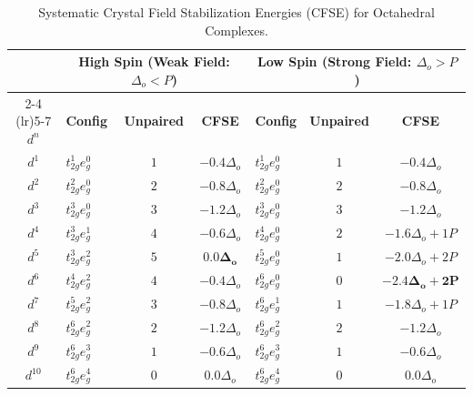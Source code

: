 \documentclass[10pt,a4paper]{article}
\begin{document}
\begin{table}[htbp]
\centering
\small
\renewcommand{\arraystretch}{1.25}
\begin{tabularx}{\textwidth}{c p{3.2cm} c c p{3.2cm} c c}
\toprule
& \multicolumn{3}{c}{\textbf{High Spin (Weak Field: $\Delta_o < P$)}} & \multicolumn{3}{c}{\textbf{Low Spin (Strong Field: $\Delta_o > P$)}} \\
\cmidrule(lr){2-4} \cmidrule(lr){5-7}
$d^n$ & \textbf{Config} & \textbf{Unpaired} & \textbf{CFSE} & \textbf{Config} & \textbf{Unpaired} & \textbf{CFSE} \\
\midrule
$d^1$ & $t_{2g}^1 e_g^0$ & $1$ & $-0.4\Delta_o$ & $t_{2g}^1 e_g^0$ & $1$ & $-0.4\Delta_o$ \\
$d^2$ & $t_{2g}^2 e_g^0$ & $2$ & $-0.8\Delta_o$ & $t_{2g}^2 e_g^0$ & $2$ & $-0.8\Delta_o$ \\
$d^3$ & $t_{2g}^3 e_g^0$ & $3$ & $-1.2\Delta_o$ & $t_{2g}^3 e_g^0$ & $3$ & $-1.2\Delta_o$ \\
$d^4$ & $t_{2g}^3 e_g^1$ & $4$ & $-0.6\Delta_o$ & $t_{2g}^4 e_g^0$ & $2$ & $-1.6\Delta_o + 1P$ \\
$d^5$ & $t_{2g}^3 e_g^2$ & $5$ & $\mathbf{0.0\Delta_o}$ & $t_{2g}^5 e_g^0$ & $1$ & $-2.0\Delta_o + 2P$ \\
$d^6$ & $t_{2g}^4 e_g^2$ & $4$ & $-0.4\Delta_o$ & $t_{2g}^6 e_g^0$ & $0$ & $\mathbf{-2.4\Delta_o + 2P}$ \\
$d^7$ & $t_{2g}^5 e_g^2$ & $3$ & $-0.8\Delta_o$ & $t_{2g}^6 e_g^1$ & $1$ & $-1.8\Delta_o + 1P$ \\
$d^8$ & $t_{2g}^6 e_g^2$ & $2$ & $-1.2\Delta_o$ & $t_{2g}^6 e_g^2$ & $2$ & $-1.2\Delta_o$ \\
$d^9$ & $t_{2g}^6 e_g^3$ & $1$ & $-0.6\Delta_o$ & $t_{2g}^6 e_g^3$ & $1$ & $-0.6\Delta_o$ \\
$d^{10}$ & $t_{2g}^6 e_g^4$ & $0$ & $0.0\Delta_o$ & $t_{2g}^6 e_g^4$ & $0$ & $0.0\Delta_o$ \\
\bottomrule
\end{tabularx}
\caption{Systematic Crystal Field Stabilization Energies (CFSE) for Octahedral Complexes.}
\end{table}
\end{document}
